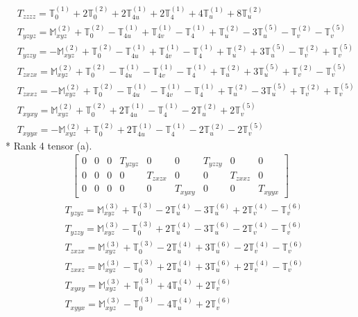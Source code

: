 \documentclass[fleqn,8pt,landscape]{jsarticle}
\begin{document}
\begin{align*}
& T_{zzzz} = \mathbb{T}_{0}^{(1)} + 2 \mathbb{T}_{0}^{(2)} + 2 \mathbb{T}_{4u}^{(1)} + 2 \mathbb{T}_{4}^{(1)} + 4 \mathbb{T}_{u}^{(1)} + 8 \mathbb{T}_{u}^{(2)} \\
& T_{yzyz} = \mathbb{M}_{xyz}^{(2)} + \mathbb{T}_{0}^{(2)} - \mathbb{T}_{4u}^{(1)} + \mathbb{T}_{4v}^{(1)} - \mathbb{T}_{4}^{(1)} + \mathbb{T}_{u}^{(2)} - 3 \mathbb{T}_{u}^{(5)} - \mathbb{T}_{v}^{(2)} - \mathbb{T}_{v}^{(5)} \\
& T_{yzzy} = - \mathbb{M}_{xyz}^{(2)} + \mathbb{T}_{0}^{(2)} - \mathbb{T}_{4u}^{(1)} + \mathbb{T}_{4v}^{(1)} - \mathbb{T}_{4}^{(1)} + \mathbb{T}_{u}^{(2)} + 3 \mathbb{T}_{u}^{(5)} - \mathbb{T}_{v}^{(2)} + \mathbb{T}_{v}^{(5)} \\
& T_{zxzx} = \mathbb{M}_{xyz}^{(2)} + \mathbb{T}_{0}^{(2)} - \mathbb{T}_{4u}^{(1)} - \mathbb{T}_{4v}^{(1)} - \mathbb{T}_{4}^{(1)} + \mathbb{T}_{u}^{(2)} + 3 \mathbb{T}_{u}^{(5)} + \mathbb{T}_{v}^{(2)} - \mathbb{T}_{v}^{(5)} \\
& T_{zxxz} = - \mathbb{M}_{xyz}^{(2)} + \mathbb{T}_{0}^{(2)} - \mathbb{T}_{4u}^{(1)} - \mathbb{T}_{4v}^{(1)} - \mathbb{T}_{4}^{(1)} + \mathbb{T}_{u}^{(2)} - 3 \mathbb{T}_{u}^{(5)} + \mathbb{T}_{v}^{(2)} + \mathbb{T}_{v}^{(5)} \\
& T_{xyxy} = \mathbb{M}_{xyz}^{(2)} + \mathbb{T}_{0}^{(2)} + 2 \mathbb{T}_{4u}^{(1)} - \mathbb{T}_{4}^{(1)} - 2 \mathbb{T}_{u}^{(2)} + 2 \mathbb{T}_{v}^{(5)} \\
& T_{xyyx} = - \mathbb{M}_{xyz}^{(2)} + \mathbb{T}_{0}^{(2)} + 2 \mathbb{T}_{4u}^{(1)} - \mathbb{T}_{4}^{(1)} - 2 \mathbb{T}_{u}^{(2)} - 2 \mathbb{T}_{v}^{(5)}
\end{align*}
* Rank 4 tensor (a).
\begin{align*}
\begin{bmatrix} 0 & 0 & 0 & T_{yzyz} & 0 & 0 & T_{yzzy} & 0 & 0 \\ 0 & 0 & 0 & 0 & T_{zxzx} & 0 & 0 & T_{zxxz} & 0 \\ 0 & 0 & 0 & 0 & 0 & T_{xyxy} & 0 & 0 & T_{xyyx} \end{bmatrix}
\end{align*}
\begin{align*}
& T_{yzyz} = \mathbb{M}_{xyz}^{(3)} + \mathbb{T}_{0}^{(3)} - 2 \mathbb{T}_{u}^{(4)} - 3 \mathbb{T}_{u}^{(6)} + 2 \mathbb{T}_{v}^{(4)} - \mathbb{T}_{v}^{(6)} \\
& T_{yzzy} = \mathbb{M}_{xyz}^{(3)} - \mathbb{T}_{0}^{(3)} + 2 \mathbb{T}_{u}^{(4)} - 3 \mathbb{T}_{u}^{(6)} - 2 \mathbb{T}_{v}^{(4)} - \mathbb{T}_{v}^{(6)} \\
& T_{zxzx} = \mathbb{M}_{xyz}^{(3)} + \mathbb{T}_{0}^{(3)} - 2 \mathbb{T}_{u}^{(4)} + 3 \mathbb{T}_{u}^{(6)} - 2 \mathbb{T}_{v}^{(4)} - \mathbb{T}_{v}^{(6)} \\
& T_{zxxz} = \mathbb{M}_{xyz}^{(3)} - \mathbb{T}_{0}^{(3)} + 2 \mathbb{T}_{u}^{(4)} + 3 \mathbb{T}_{u}^{(6)} + 2 \mathbb{T}_{v}^{(4)} - \mathbb{T}_{v}^{(6)} \\
& T_{xyxy} = \mathbb{M}_{xyz}^{(3)} + \mathbb{T}_{0}^{(3)} + 4 \mathbb{T}_{u}^{(4)} + 2 \mathbb{T}_{v}^{(6)} \\
& T_{xyyx} = \mathbb{M}_{xyz}^{(3)} - \mathbb{T}_{0}^{(3)} - 4 \mathbb{T}_{u}^{(4)} + 2 \mathbb{T}_{v}^{(6)}
\end{align*}
\end{document}
